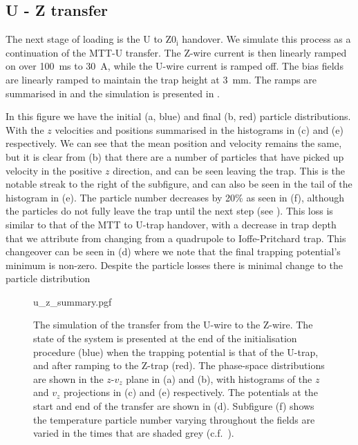 \subsection{U - Z transfer}
\label{design:sim:U_to_Z0i}

The next stage of loading is the U to $\mathrm{Z0_i}$ handover. We simulate
this process as a continuation of the MTT-U transfer.  The Z-wire current is
then linearly ramped on over \SI{100}{\milli\second} to \SI{30}{\ampere}, while
the U-wire current is ramped off. The
bias fields are linearly ramped to maintain the trap height at
\SI{3}{\milli\meter}. The ramps are summarised in 
and the simulation is presented in .

In this figure we have the initial (a, blue) and final (b, red) particle
distributions.  With the $z$ velocities and positions summarised in the
histograms in (c) and (e) respectively. We can see that the mean position and
velocity remains the same, but it is clear from (b) that there are a number of
particles that have picked up velocity in the positive $z$ direction, and can
be seen leaving the trap. This is the notable streak to the right of the
subfigure, and can also be seen in the tail of the histogram in (e). The
particle number decreases by 20\% as seen in (f), although the particles do not
fully leave the trap until the next step (see
). This loss is similar to that of the MTT to
U-trap handover, with a decrease in trap depth that we attribute from changing
from a quadrupole to Ioffe-Pritchard trap. This changeover can be seen in (d)
where we note that the final trapping potential's minimum is non-zero. Despite
the particle losses there is minimal change to the particle distribution

\begin{figure}[p]
\centering
  {u_z_summary.pgf}
  \caption{
    The simulation of the transfer from the U-wire to the Z-wire. The state of
    the system is presented at the end of the initialisation procedure (blue)
    when the trapping potential is that of the U-trap, and after ramping to the
    Z-trap (red). The phase-space distributions are shown in the $z$-$v_z$
    plane in (a) and (b), with histograms of the $z$ and $v_z$ projections in
    (c) and (e) respectively. The potentials at the start and end of the
    transfer are shown in (d). Subfigure (f) shows the temperature particle
    number varying throughout the fields are varied in the times that are
    shaded grey (c.f.~).
  }
  \label{design:fig:uzsim}
\end{figure}

